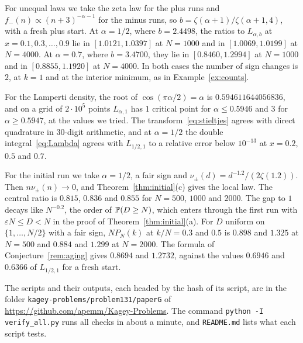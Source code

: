 For unequal laws we take the zeta law for the plus runs and
$f_\minus(n)\propto(n+3)^{-\alpha-1}$ for the minus runs, so $b=\zeta(\alpha+1)/\zeta(\alpha+1,4)$,
with a fresh plus start. At $\alpha=1/2$, where $b=2.4498$, the ratios to $L_{\alpha,b}$ at
$x=0.1,0.3,\dots,0.9$ lie in $[1.0121,1.0397]$ at $N=1000$ and in $[1.0069,1.0199]$ at
$N=4000$. At $\alpha=0.7$, where $b=3.4700$, they lie in $[0.8460,1.2994]$ at $N=1000$ and in
$[0.8855,1.1920]$ at $N=4000$. In both cases the number of sign changes is $2$, at $k=1$ and at
the interior minimum, as in Example~\ref{ex:counts}.

For the Lamperti density, the root of $\cos(\pi\alpha/2)=\alpha$ is
$0.594611644056836$, and on a grid of $2\cdot10^5$ points $L_{\alpha,1}$ has $1$ critical
point for $\alpha\le0.5946$ and $3$ for $\alpha\ge0.5947$, at the values we tried. The
transform~\eqref{eq:stieltjes} agrees with direct quadrature in $30$-digit arithmetic, and
at $\alpha=1/2$ the double integral~\eqref{eq:Lambda} agrees with $L_{1/2,1}$ to a relative
error below $10^{-13}$ at $x=0.2$, $0.5$ and $0.7$.

For the initial run we take $\alpha=1/2$, a fair sign and $\nu_\pm(d)=d^{-1.2}/(2\zeta(1.2))$.
Then $n\nu_\pm(n)\to0$, and Theorem~\ref{thm:initial}(c) gives the local law. The central
ratio is $0.815$, $0.836$ and $0.855$ for $N=500$, $1000$ and $2000$. The gap to $1$ decays
like $N^{-0.2}$, the order of $\mathbb{P}(D\ge N)$, which enters through the first run with
$\varepsilon N\le D<N$ in the proof of Theorem~\ref{thm:initial}(a). For $D$ uniform on
$\{1,\dots,N/2\}$ with a fair sign, $NP_N(k)$ at $k/N=0.3$ and $0.5$ is $0.898$ and $1.325$
at $N=500$ and $0.884$ and $1.299$ at $N=2000$. The formula of Conjecture~\ref{rem:aging}
gives $0.8694$ and $1.2732$, against the values $0.6946$ and $0.6366$ of $L_{1/2,1}$ for a
fresh start.

The scripts and their outputs, each headed by the hash of its script, are in the folder
\nolinkurl{kagey-problems/problem131/paperG} of \url{https://github.com/apemm/Kagey-Problems}.
The command \texttt{python -I verify\_all.py} runs all checks in about a minute, and
\nolinkurl{README.md} lists what each script tests.
